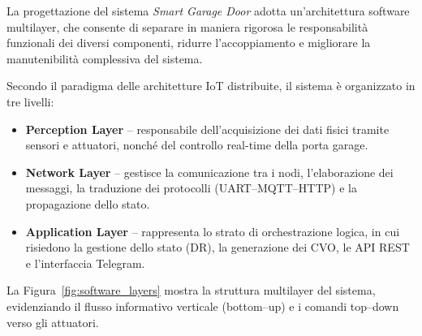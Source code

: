 La progettazione del sistema \textit{Smart Garage Door} adotta un’architettura software multilayer,
che consente di separare in maniera rigorosa le responsabilità funzionali dei diversi componenti,
ridurre l’accoppiamento e migliorare la manutenibilità complessiva del sistema.

Secondo il paradigma delle architetture IoT distribuite, il sistema è organizzato in tre livelli:

\begin{itemize}
    \item \textbf{Perception Layer} – responsabile dell’acquisizione dei dati fisici tramite sensori e
    attuatori, nonché del controllo real-time della porta garage.
    \item \textbf{Network Layer} – gestisce la comunicazione tra i nodi, l’elaborazione dei messaggi,
    la traduzione dei protocolli (UART–MQTT–HTTP) e la propagazione dello stato.
    \item \textbf{Application Layer} – rappresenta lo strato di orchestrazione logica, in cui risiedono
    la gestione dello stato (DR), la generazione dei CVO, le API REST e l’interfaccia Telegram.
\end{itemize}

La Figura~\ref{fig:software_layers} mostra la struttura multilayer del sistema, evidenziando il
flusso informativo verticale (bottom–up) e i comandi top–down verso gli attuatori.


